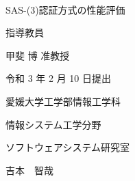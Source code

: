 \pagestyle{empty}
\setlength{\oddsidemargin}{-2.0cm}
\setlength{\textwidth}{20cm}

\
\vspace{3cm}

\begin{center}
{\LARGE {SAS-(3)認証方式の性能評価}}\\

\vspace{9mm}

{\Large 指導教員}

\vspace{5mm}

{\Large 甲斐 博 准教授}\\

\vspace{5cm}

{\Large 令和 3 年 2 月 10 日提出}\\

\vspace{20mm}

{\Large 愛媛大学工学部情報工学科}\\

\vspace{4mm}

{\Large 情報システム工学分野}\\

\vspace{4mm}

{\Large ソフトウェアシステム研究室}\\

\vspace{18mm}

{\huge 吉本　智哉}\\

\end{center}


